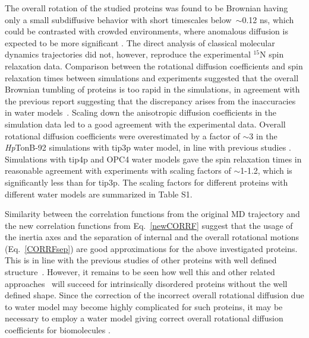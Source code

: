 \documentclass[journal=jpcbfk,manuscript=article]{achemso}
\begin{document}
The overall rotation of the studied proteins was found to be Brownian having
only a small subdiffusive behavior with short timescales
below~$\sim$0.12 ns, which could be contrasted with crowded environments,
where anomalous diffusion is expected to be more significant \cite{hofling13}.
The direct analysis of classical molecular dynamics trajectories did not, however,
reproduce the experimental $^{15}$N spin relaxation data. Comparison between the rotational 
diffusion coefficients and spin relaxation times between simulations
and experiments suggested that
the overall Brownian tumbling of proteins is too rapid in the simulations,
in agreement with the previous report suggesting that the discrepancy arises
from the inaccuracies in water models~\cite{wong08,takemura12,debiec16}.
Scaling down the anisotropic diffusion coefficients in the simulation data
led to a good agreement with the experimental data.
Overall rotational diffusion coefficients were overestimated by a factor of $\sim$3 in
the {\it Hp}TonB-92 simulations with tip3p water model, in line with previous
studies \cite{prompers02,wong08,anderson12,linke18}. Simulations with tip4p and OPC4
water models gave the spin relaxation times in reasonable agreement with experiments
with scaling factors of $\sim$1-1.2, which is significantly less than for tip3p.
The scaling factors for different proteins with
different water models are summarized in Table S1.

Similarity between the correlation functions from the original MD trajectory and
the new correlation functions from Eq.~\ref{newCORRF} 
suggest that the usage of the inertia axes
and the separation of internal and the overall rotational motions
(Eq.~\ref{CORRFsep}) are good approximations for the above investigated
proteins. This is in line with the previous studies of other  
proteins with well defined structure~\cite{wong08,allner15}. However, it remains to be seen
how well this and other related approaches~\cite{prompers02,anderson12,chia18} 
will succeed for intrinsically disordered proteins without
the well defined shape. Since the correction of the incorrect overall
rotational diffusion due to water model may become highly complicated for such proteins,
it may be necessary to employ a water model giving correct
overall rotational diffusion coefficients for biomolecules \cite{takemura12,debiec16}.
\end{document}
